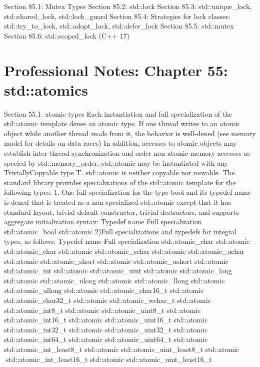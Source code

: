 Section 85.1: Mutex Types Section 85.2: std::lock Section 85.3:
std::unique\_lock, std::shared\_lock, std::lock\_guard Section 85.4:
Strategies for lock classes: std::try\_to\_lock, std::adopt\_lock,
std::defer\_lock Section 85.5: std::mutex Section 85.6:
std::scoped\_lock (C++ 17)

\hypertarget{professional-notes-chapter-55-stdatomics}{%
\chapter{Professional Notes: Chapter 55:
std::atomics}\label{professional-notes-chapter-55-stdatomics}}

Section 55.1: atomic types Each instantiation and full specialization of
the std::atomic template denes an atomic type. If one thread writes to
an atomic object while another thread reads from it, the behavior is
well-dened (see memory model for details on data races) In addition,
accesses to atomic objects may establish inter-thread synchronization
and order non-atomic memory accesses as specied by std::memory\_order.
std::atomic may be instantiated with any TriviallyCopyable type T.
std::atomic is neither copyable nor movable. The standard library
provides specializations of the std::atomic template for the following
types: 1. One full specialization for the type bool and its typedef name
is dened that is treated as a non-specialized std::atomic except that it
has standard layout, trivial default constructor, trivial destructors,
and supports aggregate initialization syntax: Typedef name Full
specialization std::atomic\_bool std::atomic 2)Full specializations and
typedefs for integral types, as follows: Typedef name Full
specialization std::atomic\_char std::atomic std::atomic\_char
std::atomic std::atomic\_schar std::atomic std::atomic\_uchar
std::atomic std::atomic\_short std::atomic std::atomic\_ushort
std::atomic std::atomic\_int std::atomic std::atomic\_uint std::atomic
std::atomic\_long std::atomic std::atomic\_ulong std::atomic
std::atomic\_llong std::atomic std::atomic\_ullong std::atomic
std::atomic\_char16\_t std::atomic std::atomic\_char32\_t std::atomic
std::atomic\_wchar\_t std::atomic std::atomic\_int8\_t std::atomic
std::atomic\_uint8\_t std::atomic std::atomic\_int16\_t std::atomic
std::atomic\_uint16\_t std::atomic std::atomic\_int32\_t std::atomic
std::atomic\_uint32\_t std::atomic std::atomic\_int64\_t std::atomic
std::atomic\_uint64\_t std::atomic std::atomic\_int\_least8\_t
std::atomic std::atomic\_uint\_least8\_t std::atomic
std::atomic\_int\_least16\_t std::atomic std::atomic\_uint\_least16\_t
